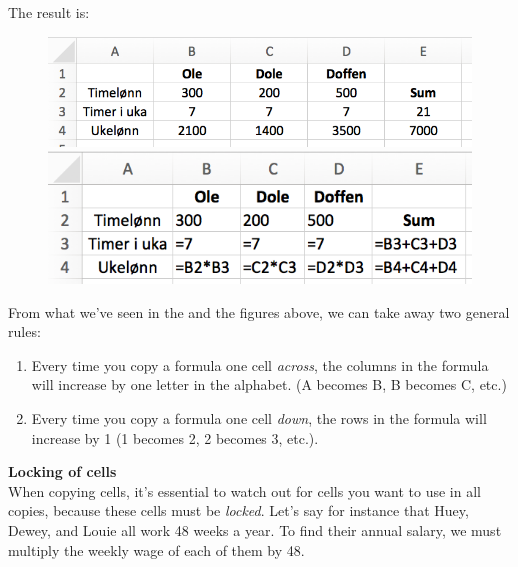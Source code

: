 The result is:
\begin{figure}[H]
	\centering
	\includegraphics[scale=0.3]{figs/ex8}\\[5pt]
	\includegraphics[scale=0.3]{figs/ex15}
\end{figure}
From what we've seen in the  and the figures above, we can take away two general rules:
\begin{enumerate}
	\item Every time you copy a formula one cell \textsl{across}, the columns in the formula will increase by one letter in the alphabet. (A becomes B, B becomes C, etc.)
	\item Every time you copy a formula one cell \textsl{down}, the rows in the formula will increase by 1 (1 becomes 2, 2 becomes 3, etc.).
\end{enumerate}

\textbf{Locking of cells}\\[2pt]
When copying cells, it's essential to watch out for cells you want to use in all copies, because these cells must be \textit{locked}. Let's say for instance that Huey, Dewey, and Louie all work 48 weeks a year. To find their annual salary, we must multiply the weekly wage of each of them by 48. \vsk

